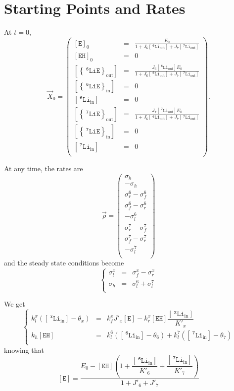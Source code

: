 \documentclass[aps,onecolumn,11pt]{revtex4}
\newcommand{\mychem}[1]{\mathtt{#1}}
\newcommand{\myconc}[1]{\left\lbrack{#1}\right\rbrack}
\newcommand{\spLi}[1]{{~^{\mychem{#1}}\mychem{Li}}}
\newcommand{\spEout}{\mychem{E}}
\newcommand{\Eout}{\myconc{\spEout}}
\newcommand{\spLiEin}[1]{\left\lbrace\spLi{#1}\spEout\right\rbrace_{\mathrm{in}}}
\newcommand{\LiEin}[1]{\myconc{\spLiEin{#1}}}
\newcommand{\spLiEout}[1]{\left\lbrace\spLi{#1}\spEout\right\rbrace_{\mathrm{out}}}
\newcommand{\LiEout}[1]{\myconc{\spLiEout{#1}}}
\newcommand{\spLiIn}[1]{{\spLi{#1}}_{\mathrm{in}}}
\newcommand{\LiIn}[1]{\myconc{\spLiIn{#1}}}
\newcommand{\spLiOut}[1]{{\spLi{#1}}_{\mathrm{out}}}
\newcommand{\LiOut}[1]{\myconc{\spLiOut{#1}}}
\newcommand{\spEHin}{\mychem{EH}}
\newcommand{\EHin}{\myconc{\spEHin}}
\begin{document}
\section{Starting Points and Rates}

At $t=0$,
\begin{equation}
	\vec{X}_0 = 
	\begin{pmatrix}
	\Eout_0    & = & \frac{E_0}{1+J_6 \LiOut{6} + J_7 \LiOut{7}}  \\
	\EHin_0    & = & 0 \\
	\LiEout{6} & = & \frac{J_6 \LiOut{6} E_0} {1+J_6 \LiOut{6} + J_7 \LiOut{7}} \\
	\LiEin{6}  & = & 0 \\
	\LiIn{6}   & = & 0 \\
	\LiEout{7} & = & \frac{J_7 \LiOut{7} E_0} {1+J_6 \LiOut{6} + J_7 \LiOut{7}}   \\
	\LiEin{7}  & = & 0 \\
	\LiIn{7}   & = & 0 \\
	\end{pmatrix}.
\end{equation}

At any time, the rates are
\begin{equation}
\vec{\rho} = 
\begin{pmatrix}
	\sigma_h\\
	-\sigma_h\\
	\sigma_r^6-\sigma_f^6\\
	\sigma_f^6-\sigma_r^6\\
	-\sigma_l^6\\
	\sigma_r^7-\sigma_f^7\\
	\sigma_f^7-\sigma_r^7\\
	-\sigma_l^7\\
\end{pmatrix}
\end{equation}
and the steady state conditions become
\begin{equation}
	\left\lbrace
	\begin{array}{rcl}
		\sigma_l^x & = & \sigma_f^x - \sigma_r^x\\
		\sigma_h   & = & \sigma_l^6 + \sigma_l^7\\
	\end{array}
	\right.
\end{equation}

We get
\begin{equation}
\left\lbrace
	\begin{array}{rcl}
	k_l^x \left(\LiIn{x}-\theta_x\right) & = & k_f^x J'_x \Eout - k_r^x \EHin \dfrac{\LiIn{x}}{K'_x}\\
	k_h \EHin & = & k_l^6 \left(\LiIn{6}-\theta_6\right) + k_l^7 \left(\LiIn{7}-\theta_7\right)\\
	\end{array}
\right.
\end{equation}
knowing that
\begin{equation}
	\Eout = \dfrac{E_0 - \EHin \left( 1 + \dfrac{\LiIn{6}}{K'_6} + \dfrac{\LiIn{7}}{K'_7}\right)}
	{1+J'_6+J'_7}
\end{equation}
\end{document}
